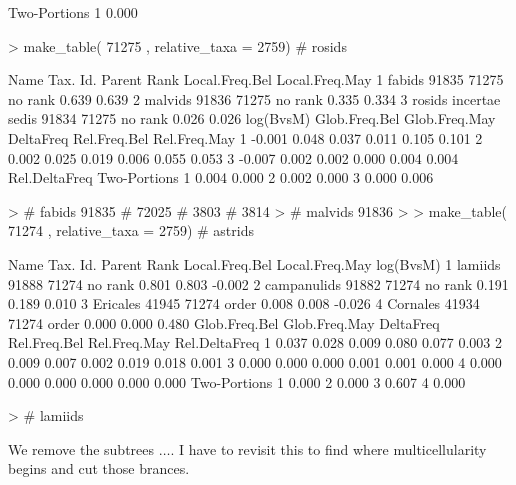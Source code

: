 \documentclass{article}
\begin{document}
\begin{Schunk}
\begin{Soutput}
  Two-Portions
1        0.000
\end{Soutput}
\begin{Sinput}
> make_table( 71275 , relative_taxa = 2759) # rosids
\end{Sinput}
\begin{Soutput}
                   Name Tax. Id. Parent    Rank Local.Freq.Bel Local.Freq.May
1                fabids    91835  71275 no rank          0.639          0.639
2               malvids    91836  71275 no rank          0.335          0.334
3 rosids incertae sedis    91834  71275 no rank          0.026          0.026
  log(BvsM) Glob.Freq.Bel Glob.Freq.May DeltaFreq Rel.Freq.Bel Rel.Freq.May
1    -0.001         0.048         0.037     0.011        0.105        0.101
2     0.002         0.025         0.019     0.006        0.055        0.053
3    -0.007         0.002         0.002     0.000        0.004        0.004
  Rel.DeltaFreq Two-Portions
1         0.004        0.000
2         0.002        0.000
3         0.000        0.006
\end{Soutput}
\begin{Sinput}
> # fabids 91835 # 72025 # 3803 # 3814 
> # malvids 91836
> 
> make_table( 71274 , relative_taxa = 2759) # astrids
\end{Sinput}
\begin{Soutput}
         Name Tax. Id. Parent    Rank Local.Freq.Bel Local.Freq.May log(BvsM)
1     lamiids    91888  71274 no rank          0.801          0.803    -0.002
2 campanulids    91882  71274 no rank          0.191          0.189     0.010
3    Ericales    41945  71274   order          0.008          0.008    -0.026
4    Cornales    41934  71274   order          0.000          0.000     0.480
  Glob.Freq.Bel Glob.Freq.May DeltaFreq Rel.Freq.Bel Rel.Freq.May Rel.DeltaFreq
1         0.037         0.028     0.009        0.080        0.077         0.003
2         0.009         0.007     0.002        0.019        0.018         0.001
3         0.000         0.000     0.000        0.001        0.001         0.000
4         0.000         0.000     0.000        0.000        0.000         0.000
  Two-Portions
1        0.000
2        0.000
3        0.607
4        0.000
\end{Soutput}
\begin{Sinput}
> # lamiids 
\end{Sinput}
\end{Schunk}
 
We remove the subtrees $\ldots$.
I have to revisit this to find where multicellularity begins and cut those brances.
\end{document}
